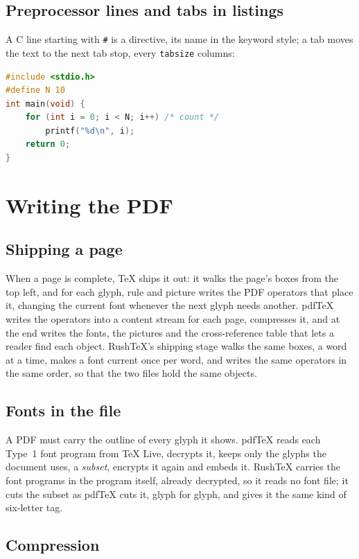 \documentclass{article}
\numberwithin{equation}{section}
\theoremstyle{definition}
\theoremstyle{remark}
\begin{document}
\subsection{Preprocessor lines and tabs in listings}\label{sec:lstdirectives}
A C line starting with \texttt{\#} is a directive, its name in the keyword style; a tab
moves the text to the next tab stop, every \texttt{tabsize} columns:
\begin{lstlisting}[language=C,tabsize=4,keywordstyle=\color{rtdeep}\bfseries]
#include <stdio.h>
#define N 10
int main(void) {
	for (int i = 0; i < N; i++)	/* count */
		printf("%d\n", i);
	return 0;
}
\end{lstlisting}

\section{Writing the PDF}\label{sec:pdf}

\subsection{Shipping a page}

When a page is complete, \TeX{} ships it out: it walks the page's boxes from the top
left, and for each glyph, rule and picture writes the PDF operators that place it,
changing the current font whenever the next glyph needs another. pdfTeX writes the
operators into a content stream for each page, compresses it, and at the end writes the
fonts, the pictures and the cross-reference table that lets a reader find each object.
RushTeX's shipping stage walks the same boxes, a word at a time, makes a font current
once per word, and writes the same operators in the same order, so that the two files
hold the same objects.

\subsection{Fonts in the file}

A PDF must carry the outline of every glyph it shows. pdfTeX reads each Type~1 font
program from \TeX{} Live, decrypts it, keeps only the glyphs the document uses, a
\emph{subset}, encrypts it again and embeds it. RushTeX carries the font programs in the
program itself, already decrypted, so it reads no font file; it cuts the subset as
pdfTeX cuts it, glyph for glyph, and gives it the same kind of six-letter tag.

\subsection{Compression}
\end{document}
